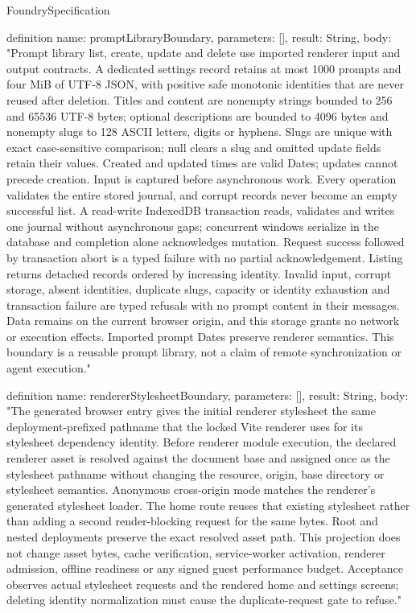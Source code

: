 \begin{lexlean}{FoundrySpecification}
\begin{semanticmodule}
definition{
  name: promptLibraryBoundary,
  parameters: [],
  result: String,
  body: "Prompt library list, create, update and delete use imported renderer input and output contracts. A dedicated settings record retains at most 1000 prompts and four MiB of UTF-8 JSON, with positive safe monotonic identities that are never reused after deletion. Titles and content are nonempty strings bounded to 256 and 65536 UTF-8 bytes; optional descriptions are bounded to 4096 bytes and nonempty slugs to 128 ASCII letters, digits or hyphens. Slugs are unique with exact case-sensitive comparison; null clears a slug and omitted update fields retain their values. Created and updated times are valid Dates; updates cannot precede creation. Input is captured before asynchronous work. Every operation validates the entire stored journal, and corrupt records never become an empty successful list. A read-write IndexedDB transaction reads, validates and writes one journal without asynchronous gaps; concurrent windows serialize in the database and completion alone acknowledges mutation. Request success followed by transaction abort is a typed failure with no partial acknowledgement. Listing returns detached records ordered by increasing identity. Invalid input, corrupt storage, absent identities, duplicate slugs, capacity or identity exhaustion and transaction failure are typed refusals with no prompt content in their messages. Data remains on the current browser origin, and this storage grants no network or execution effects. Imported prompt Dates preserve renderer semantics. This boundary is a reusable prompt library, not a claim of remote synchronization or agent execution."
}

definition{
  name: rendererStylesheetBoundary,
  parameters: [],
  result: String,
  body: "The generated browser entry gives the initial renderer stylesheet the same deployment-prefixed pathname that the locked Vite renderer uses for its stylesheet dependency identity. Before renderer module execution, the declared renderer asset is resolved against the document base and assigned once as the stylesheet pathname without changing the resource, origin, base directory or stylesheet semantics. Anonymous cross-origin mode matches the renderer's generated stylesheet loader. The home route reuses that existing stylesheet rather than adding a second render-blocking request for the same bytes. Root and nested deployments preserve the exact resolved asset path. This projection does not change asset bytes, cache verification, service-worker activation, renderer admission, offline readiness or any signed guest performance budget. Acceptance observes actual stylesheet requests and the rendered home and settings screens; deleting identity normalization must cause the duplicate-request gate to refuse."
}


\end{semanticmodule}
\end{lexlean}
